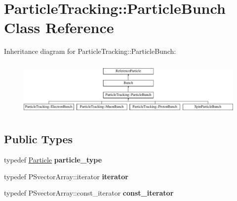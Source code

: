 \hypertarget{classParticleTracking_1_1ParticleBunch}{}\section{Particle\+Tracking\+:\+:Particle\+Bunch Class Reference}
\label{classParticleTracking_1_1ParticleBunch}
Inheritance diagram for Particle\+Tracking\+:\+:Particle\+Bunch\+:\begin{figure}[H]
\begin{center}
\leavevmode
\includegraphics[height=2.786070cm]{classParticleTracking_1_1ParticleBunch}
\end{center}
\end{figure}
\subsection*{Public Types}
\begin{DoxyCompactItemize}
\item 
\mbox{\label{classParticleTracking_1_1ParticleBunch_a9bd29ef7b259882884c37d479c2c6b90}} 
typedef \hyperlink{classPSvector}{Particle} {\bfseries particle\+\_\+type}
\item 
\mbox{\label{classParticleTracking_1_1ParticleBunch_a689570edfbf2ac46354398e8c87318ee}} 
typedef P\+Svector\+Array\+::iterator {\bfseries iterator}
\item 
\mbox{\label{classParticleTracking_1_1ParticleBunch_af01f9b9839bbe89d082ac62c6aa058c4}} 
typedef P\+Svector\+Array\+::const\+\_\+iterator {\bfseries const\+\_\+iterator}
\end{DoxyCompactItemize}
